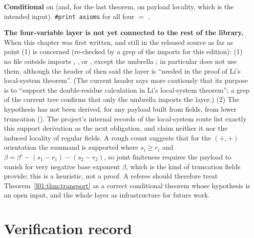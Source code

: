 \begin{status}
\textbf{Conditional} on  (and, for the last theorem, on payload locality, which
is the intended input). \texttt{\#print axioms} for all four $=$ .
\end{status}

\begin{warning}\label{l01:warn:shiftfinite}
\textbf{The four-variable layer is not yet connected to the rest of the library.} When this chapter was first written, and still in the released source as far as point (1) is concerned (re-checked by a grep of the imports for this edition):
(1) no file outside  imports ,
,  or , except
the umbrella ; in particular 
does not use them, although the header of  then said the layer is ``needed in the proof of Li's
local-system theorem''. (The current header says more cautiously that its purpose is to ``support the double-residue
calculation in Li's local-system theorem''; a grep of the current tree confirms that only the umbrella imports the layer.) (2) The hypothesis  has not been derived, for any
payload built from fields, from lower truncation (). The project's internal records of the local-system
route list exactly this support derivation as the next obligation, and claim neither it nor the induced locality of regular
fields. A rough count suggests that for the $(+,+)$ orientation the
summand is supported where $s_i\ge r_i$ and $\beta = \beta'-(s_1-r_1)-(s_2-r_2)$, so joint finiteness requires the payload to
vanish for very negative base exponent $\beta$, which is the kind of truncation fields provide; this is a heuristic, not a
proof. A referee should therefore treat Theorem~\ref{l01:thm:transport} as a correct conditional theorem whose hypothesis is
an open input, and the whole layer as infrastructure for future work.
\end{warning}

\section{Verification record}\label{l01:sec:verification}

